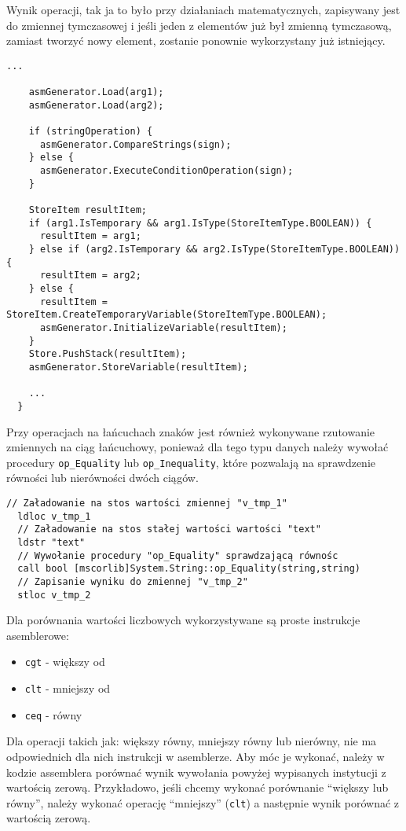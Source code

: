 \par Wynik operacji, tak ja to było przy działaniach matematycznych, zapisywany jest do zmiennej tymczasowej i jeśli jeden z elementów już był zmienną tymczasową, zamiast tworzyć nowy element, zostanie ponownie wykorzystany już istniejący.

\begin{lstlisting}[language=CSharp, caption={Implementacja funkcji obsługującej wyrażenia warunkowe cz.2}, label=alg:condition4]
    ...

    asmGenerator.Load(arg1);
    asmGenerator.Load(arg2);

    if (stringOperation) {
      asmGenerator.CompareStrings(sign);
    } else {
      asmGenerator.ExecuteConditionOperation(sign);
    }

    StoreItem resultItem;
    if (arg1.IsTemporary && arg1.IsType(StoreItemType.BOOLEAN)) {
      resultItem = arg1;
    } else if (arg2.IsTemporary && arg2.IsType(StoreItemType.BOOLEAN)) {
      resultItem = arg2;
    } else {
      resultItem = StoreItem.CreateTemporaryVariable(StoreItemType.BOOLEAN);
      asmGenerator.InitializeVariable(resultItem);
    }
    Store.PushStack(resultItem);
    asmGenerator.StoreVariable(resultItem);

    ...
  }
\end{lstlisting}

\par Przy operacjach na łańcuchach znaków jest również wykonywane rzutowanie zmiennych na ciąg łańcuchowy, ponieważ dla tego typu danych należy wywołać procedury \texttt{op\_Equality} lub \texttt{op\_Inequality}, które pozwalają na sprawdzenie równości lub nierówności dwóch ciągów.

\begin{lstlisting}[language=IL, caption={Kod assemblera przedstawiający porównanie dwóch łańcuchów zanków}, label=alg:condition2]
  // Załadowanie na stos wartości zmiennej "v_tmp_1"
  ldloc v_tmp_1
  // Załadowanie na stos stałej wartości wartości "text"
  ldstr "text"
  // Wywołanie procedury "op_Equality" sprawdzającą równośc
  call bool [mscorlib]System.String::op_Equality(string,string)
  // Zapisanie wyniku do zmiennej "v_tmp_2"
  stloc v_tmp_2
\end{lstlisting}

\par Dla porównania wartości liczbowych wykorzystywane są proste instrukcje asemblerowe:
\begin{itemize}
  \item \texttt{cgt} - większy od
  \item \texttt{clt} - mniejszy od
  \item \texttt{ceq} - równy
\end{itemize}
Dla operacji takich jak: większy równy, mniejszy równy lub nierówny, nie ma odpowiednich dla nich instrukcji w asemblerze. Aby móc je wykonać, należy w kodzie assemblera porównać wynik wywołania powyżej wypisanych instytucji z wartością zerową. Przykładowo, jeśli chcemy wykonać porównanie ``większy lub równy'', należy wykonać operację ``mniejszy'' (\texttt{clt}) a następnie wynik porównać z wartością zerową.

